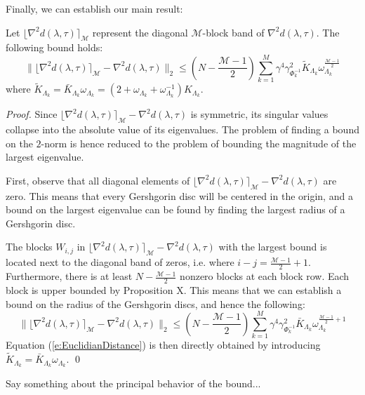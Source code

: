 Finally, we can establish our main result:
\begin{lemma} \label{l:EuclidianDistance}
Let $ \lfloor \nabla^2 d(\lambda, \tau) \rceil_{\mathcal{M}}$ represent the diagonal $\mathcal{M}$-block band of $\nabla^2 d(\lambda, \tau)$. The following bound holds:
\begin{equation} \label{e:EuclidianDistance}
\| \lfloor \nabla^2 d(\lambda, \tau) \rceil_{\mathcal{M}} - \nabla^2 d(\lambda, \tau) \|_2 \leq \left( N -\frac{\mathcal{M} - 1}{2} \right) \sum_{k=1}^M \gamma^4 \gamma_{\Phi_k^{-1}}^2 \tilde{K}_{\Lambda_k} \omega_{\Lambda_k}^{\frac{\mathcal{M} - 1}{2}}
\end{equation}
where $\tilde{K}_{\Lambda_k} = \bar{K}_{\Lambda_k} \omega_{\Lambda_k} =  (2 + \omega_{\Lambda_k} + \omega_{\Lambda_k}^{-1}) K_{\Lambda_k}$.
\end{lemma}
\begin{proof}
Since $\lfloor \nabla^2 d(\lambda, \tau) \rceil_{\mathcal{M}} - \nabla^2 d(\lambda, \tau)$ is symmetric, its singular values collapse into the absolute value of its eigenvalues. The problem of finding a bound on the $2$-norm is hence reduced to the problem of bounding the magnitude of the largest eigenvalue.

First, observe that all diagonal elements of $\lfloor \nabla^2 d(\lambda, \tau) \rceil_{\mathcal{M}} - \nabla^2 d(\lambda, \tau)$ are zero. This means that every Gershgorin disc will be centered in the origin, and a bound on the largest eigenvalue can be found by finding the largest radius of a Gershgorin disc.

The blocks $W_{i,j}$ in $\lfloor \nabla^2 d(\lambda, \tau) \rceil_{\mathcal{M}} - \nabla^2 d(\lambda, \tau)$ with the largest bound is located next to the diagonal band of zeros, i.e. where $i - j = \frac{\mathcal{M} - 1}{2} + 1$. Furthermore, there is at least $N -\frac{\mathcal{M} - 1}{2}$ nonzero blocks at each block row. Each block is upper bounded by Proposition X. This means that we can establish a bound on the radius of the Gershgorin discs, and hence the following:
\begin{equation}
\| \lfloor \nabla^2 d(\lambda, \tau) \rceil_{\mathcal{M}} - \nabla^2 d(\lambda, \tau) \|_2 \leq \left( N -\frac{\mathcal{M} - 1}{2} \right) \sum_{k=1}^M \gamma^4 \gamma_{\Phi_k^{-1}}^2 \bar{K}_{\Lambda_k} \omega_{\Lambda_k}^{\frac{\mathcal{M} - 1}{2} + 1}
\end{equation}
Equation (\ref{e:EuclidianDistance}) is then directly obtained by introducing $\tilde{K}_{\Lambda_k} = \bar{K}_{\Lambda_k} \omega_{\Lambda_k}$.
\qed
\end{proof}
Say something about the principal behavior of the bound...

